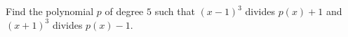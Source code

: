 Find the polynomial $p$ of degree $5$ such that $(x-1)^3$ divides $p(x)+1$ and $(x+1)^3$ divides $p(x)-1$.
